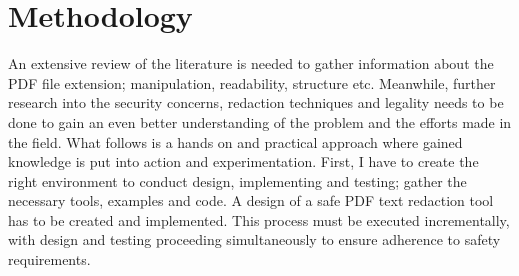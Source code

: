 \section{Methodology}
\label{sec:methodology}

An extensive review of the literature is needed to gather information about the PDF file extension; manipulation, readability, structure etc. Meanwhile, further research into the security concerns, redaction techniques and legality needs to be done to gain an even better understanding of the problem and the efforts made in the field. What follows is a hands on and practical approach where gained knowledge is put into action and experimentation. First, I have to create the right environment to conduct design, implementing and testing; gather the necessary tools, examples and code. A design of a safe PDF text redaction tool has to be created and implemented. This process must be executed incrementally, with design and testing proceeding simultaneously to ensure adherence to safety requirements.